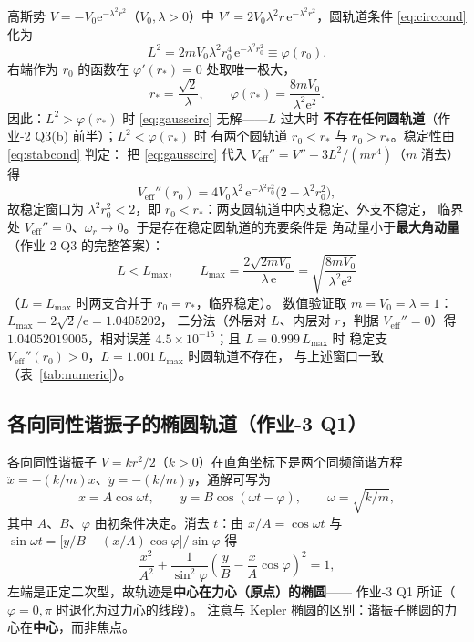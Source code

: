 \documentclass[UTF8,a4paper,11pt]{ctexart}
\begin{document}
高斯势 $V=-V_0\mathrm{e}^{-\lambda^2r^2}$（$V_0,\lambda>0$）中
$V'=2V_0\lambda^2r\,\mathrm{e}^{-\lambda^2r^2}$，圆轨道条件
\eqref{eq:circcond} 化为
\begin{equation}
  L^2=2mV_0\lambda^2r_0^4\,\mathrm{e}^{-\lambda^2r_0^2}
  \equiv\varphi(r_0).
  \label{eq:gausscirc}
\end{equation}
右端作为 $r_0$ 的函数在 $\varphi'(r_*)=0$ 处取唯一极大，
\begin{equation}
  r_*=\frac{\sqrt2}{\lambda},
  \qquad
  \varphi(r_*)=\frac{8mV_0}{\lambda^2\mathrm{e}^2}.
  \label{eq:gaussstar}
\end{equation}
因此：$L^2>\varphi(r_*)$ 时 \eqref{eq:gausscirc} 无解——$L$ 过大时
\textbf{不存在任何圆轨道}（作业-2 Q3(b) 前半）；$L^2<\varphi(r_*)$ 时
有两个圆轨道 $r_0<r_*$ 与 $r_0>r_*$。稳定性由 \eqref{eq:stabcond} 判定：
把 \eqref{eq:gausscirc} 代入 $V_{\mathrm{eff}}''=V''+3L^2/(mr^4)$（$m$ 消去）得
\begin{equation}
  V_{\mathrm{eff}}''(r_0)=4V_0\lambda^2\,\mathrm{e}^{-\lambda^2r_0^2}
  \bigl(2-\lambda^2r_0^2\bigr),
  \label{eq:gaussd2}
\end{equation}
故稳定窗口为 $\lambda^2r_0^2<2$，即 $r_0<r_*$：两支圆轨道中内支稳定、外支不稳定，
临界处 $V_{\mathrm{eff}}''=0$、$\omega_r\to0$。于是存在稳定圆轨道的充要条件是
角动量小于\textbf{最大角动量}（作业-2 Q3 的完整答案）：
\begin{equation}
  \boxed{\;L<L_{\max},\qquad
  L_{\max}=\frac{2\sqrt{2mV_0}}{\lambda\,\mathrm{e}}
  =\sqrt{\frac{8mV_0}{\lambda^2\mathrm{e}^2}}\;}
  \label{eq:Lmax}
\end{equation}
（$L=L_{\max}$ 时两支合并于 $r_0=r_*$，临界稳定）。
数值验证取 $m=V_0=\lambda=1$：$L_{\max}=2\sqrt2/\mathrm{e}=1.0405202$，
二分法（外层对 $L$、内层对 $r$，判据 $V_{\mathrm{eff}}''=0$）得
$1.04052019005$，相对误差 $4.5\times10^{-15}$；且 $L=0.999\,L_{\max}$ 时
稳定支 $V_{\mathrm{eff}}''(r_0)>0$，$L=1.001\,L_{\max}$ 时圆轨道不存在，
与上述窗口一致（表~\ref{tab:numeric}）。

\subsection{各向同性谐振子的椭圆轨道（作业-3 Q1）}
\label{sub:oscillator}

各向同性谐振子 $V=kr^2/2$（$k>0$）在直角坐标下是两个同频简谐方程
$\ddot x=-(k/m)x$、$\ddot y=-(k/m)y$，通解可写为
\begin{equation}
  x=A\cos\omega t,\qquad y=B\cos(\omega t-\varphi),
  \qquad \omega=\sqrt{k/m},
  \label{eq:oscsol}
\end{equation}
其中 $A$、$B$、$\varphi$ 由初条件决定。消去 $t$：由
$x/A=\cos\omega t$ 与
$\sin\omega t=\bigl[y/B-(x/A)\cos\varphi\bigr]/\sin\varphi$ 得
\begin{equation}
  \frac{x^2}{A^2}
  +\frac{1}{\sin^2\varphi}\left(\frac{y}{B}-\frac{x}{A}\cos\varphi\right)^{\!2}=1,
  \label{eq:oscellipse}
\end{equation}
左端是正定二次型，故轨迹是\textbf{中心在力心（原点）的椭圆}——
作业-3 Q1 所证（$\varphi=0,\pi$ 时退化为过力心的线段）。
注意与 Kepler 椭圆的区别：谐振子椭圆的力心在\textbf{中心}，而非焦点。
\end{document}

